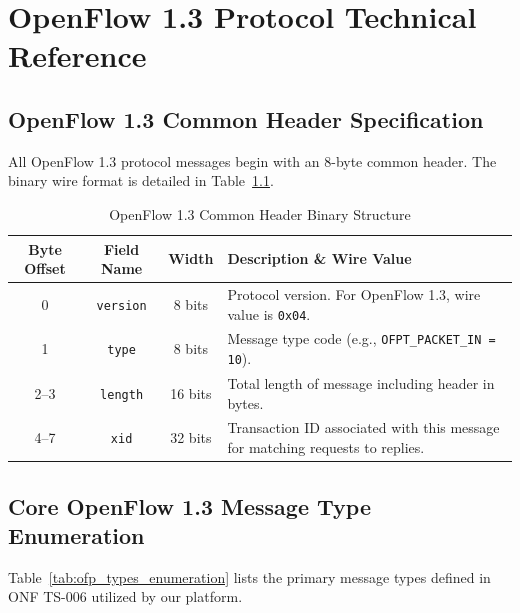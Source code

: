 \documentclass[12pt,a4paper,oneside]{report}
\begin{document}

\chapter{OpenFlow 1.3 Protocol Technical Reference}
\label{app:openflow}

\section{OpenFlow 1.3 Common Header Specification}
All OpenFlow 1.3 protocol messages begin with an 8-byte common header. The binary wire format is detailed in Table~\ref{tab:ofp_header_format}.

\begin{table}[htbp]
\centering
\caption{OpenFlow 1.3 Common Header Binary Structure}
\label{tab:ofp_header_format}
\small
\begin{tabularx}{\textwidth}{c c c X}
\toprule
\textbf{Byte Offset} & \textbf{Field Name} & \textbf{Width} & \textbf{Description \& Wire Value} \\
\midrule
0 & \texttt{version} & 8 bits & Protocol version. For OpenFlow 1.3, wire value is \texttt{0x04}. \\
1 & \texttt{type} & 8 bits & Message type code (e.g., \texttt{OFPT\_PACKET\_IN = 10}). \\
2--3 & \texttt{length} & 16 bits & Total length of message including header in bytes. \\
4--7 & \texttt{xid} & 32 bits & Transaction ID associated with this message for matching requests to replies. \\
\bottomrule
\end{tabularx}
\end{table}

\section{Core OpenFlow 1.3 Message Type Enumeration}
Table~\ref{tab:ofp_types_enumeration} lists the primary message types defined in ONF TS-006 \cite{onf2012openflow} utilized by our platform.
\end{document}
